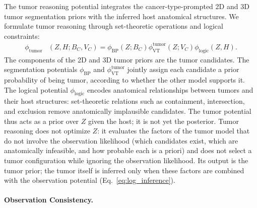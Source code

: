 \documentclass[fleqn,10pt]{olplainarticle}
\begin{document}
The tumor reasoning potential integrates
the cancer-type-prompted 2D and 3D tumor
segmentation priors with the inferred
host anatomical structures.
We formulate tumor reasoning through
set-theoretic operations and logical
constraints:
\begin{equation}
\label{eq:tumor_reasoning}
\begin{aligned}
\phi_{\mathrm{tumor}}
&(Z,H;B_C,V_C) =
\phi_{\mathrm{BP}}(Z;B_C)
\phi_{\mathrm{VT}}^{\mathrm{tumor}}(Z;V_C)
\phi_{\mathrm{logic}}(Z,H).
\end{aligned}
\end{equation}
The components of the 2D and 3D tumor priors are the
tumor candidates. The segmentation potentials
$\phi_{\mathrm{BP}}$ and $\phi_{\mathrm{VT}}^{\mathrm{tumor}}$
jointly assign each candidate a prior probability of being
tumor, according to whether the other model supports it.
The logical potential $\phi_{\mathrm{logic}}$ encodes
anatomical relationships between tumors
and their host structures:
set-theoretic relations
such as containment, intersection,
and exclusion remove anatomically
implausible candidates.
The tumor potential thus acts as a prior over $Z$ given
the host; it is not yet the posterior.
Tumor reasoning does not optimize $Z$: it evaluates the
factors of the tumor model that do not involve the observation
likelihood (which candidates
exist, which are anatomically infeasible, and how probable each
is a priori) and does not select a tumor configuration while
ignoring the observation likelihood.
Its output is the tumor prior; the tumor itself is
inferred only when these factors are combined with the
observation potential (Eq.~\eqref{eq:log_inference}).

\paragraph{Observation Consistency.}
\end{document}
